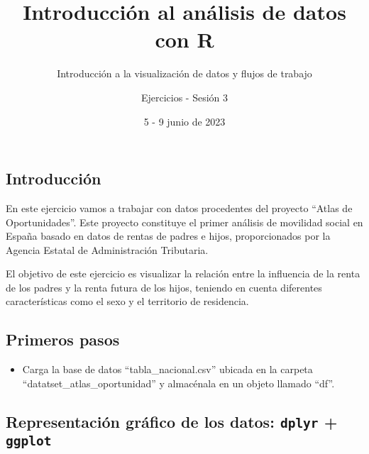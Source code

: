 \documentclass[
]{article}
\title{Introducción al análisis de datos con R}
\subtitle{Introducción a la visualización de datos y flujos de trabajo}
\author{Ejercicios - Sesión 3}
\date{5 - 9 junio de 2023}
\providecommand{\tightlist}{%
  \setlength{\itemsep}{0pt}\setlength{\parskip}{0pt}}
\begin{document}
\maketitle

\hypertarget{introducciuxf3n}{%
\subsection{Introducción}\label{introducciuxf3n}}

En este ejercicio vamos a trabajar con datos procedentes del proyecto
``Atlas de Oportunidades''. Este proyecto constituye el primer análisis
de movilidad social en España basado en datos de rentas de padres e
hijos, proporcionados por la Agencia Estatal de Administración
Tributaria.

El objetivo de este ejercicio es visualizar la relación entre la
influencia de la renta de los padres y la renta futura de los hijos,
teniendo en cuenta diferentes características como el sexo y el
territorio de residencia.

\hypertarget{primeros-pasos}{%
\subsection{Primeros pasos}\label{primeros-pasos}}

\begin{itemize}
\tightlist
\item
  Carga la base de datos ``tabla\_nacional.csv'' ubicada en la carpeta
  ``datatset\_atlas\_oportunidad'' y almacénala en un objeto llamado
  ``df''.
\end{itemize}

\hypertarget{representaciuxf3n-gruxe1fico-de-los-datos-dplyr-ggplot}{%
\subsection{\texorpdfstring{Representación gráfico de los datos:
\texttt{dplyr} +
\texttt{ggplot}}{Representación gráfico de los datos: dplyr + ggplot}}\label{representaciuxf3n-gruxe1fico-de-los-datos-dplyr-ggplot}}
\end{document}
